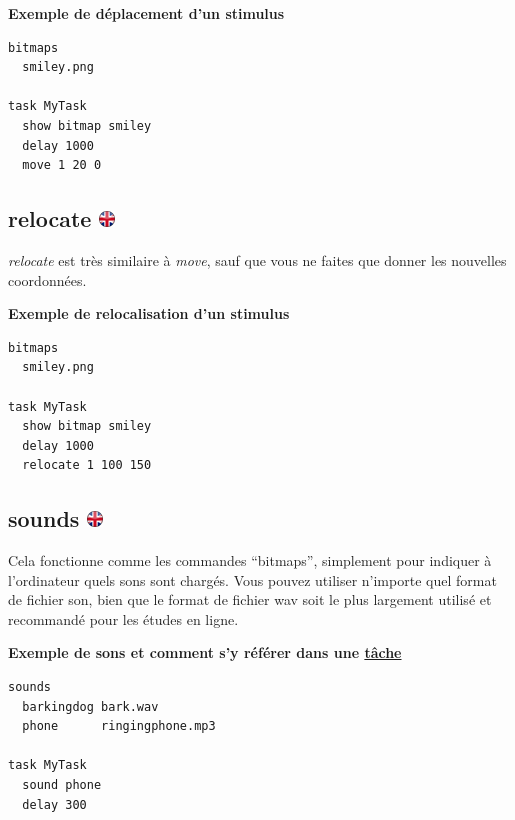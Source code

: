 \documentclass[
]{book}
\begin{document}
\textbf{Exemple de déplacement d'un stimulus}

\begin{verbatim}
bitmaps
  smiley.png

task MyTask
  show bitmap smiley
  delay 1000
  move 1 20 0
\end{verbatim}

\hypertarget{relocate}{%
\subsection[relocate ]{\texorpdfstring{relocate
\href{https://www.psytoolkit.org/doc3.2.0/syntax.html\#relocate}{\protect\includegraphics{img/ukflag.png}}}{relocate }}\label{relocate}}

\emph{relocate} est très similaire à \emph{move}, sauf que vous ne
faites que donner les nouvelles coordonnées.

\textbf{Exemple de relocalisation d'un stimulus}

\begin{verbatim}
bitmaps
  smiley.png

task MyTask
  show bitmap smiley
  delay 1000
  relocate 1 100 150
\end{verbatim}

\hypertarget{sounds}{%
\subsection[sounds ]{\texorpdfstring{sounds
\href{https://www.psytoolkit.org/doc3.2.0/syntax.html\#sounds}{\protect\includegraphics{img/ukflag.png}}}{sounds }}\label{sounds}}

Cela fonctionne comme les commandes ``bitmaps'', simplement pour
indiquer à l'ordinateur quels sons sont chargés. Vous pouvez utiliser
n'importe quel format de fichier son, bien que le format de fichier wav
soit le plus largement utilisé et recommandé pour les études en ligne.

\textbf{Exemple de sons et comment s'y référer dans une
\protect\hyperlink{s5-7}{tâche}}

\begin{verbatim}
sounds
  barkingdog bark.wav
  phone      ringingphone.mp3

task MyTask
  sound phone
  delay 300
\end{verbatim}
\end{document}
